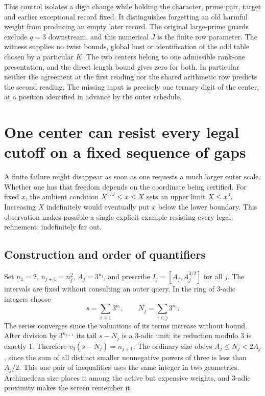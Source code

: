 \documentclass[12pt,letterpaper]{article}
\begin{document}
This control isolates a digit change while holding the character, prime pair, target and earlier exceptional record fixed. It distinguishes forgetting an old harmful weight from producing an empty later record. The original large-prime guards exclude \(q=3\) downstream, and this numerical \(J\) is the finite row parameter. The witness supplies no twist bounds, global host or identification of the odd table chosen by a particular \(K\). The two centers belong to one admissible rank-one presentation, and the direct length bound gives zero for both. In particular neither the agreement at the first reading nor the shared arithmetic row predicts the second reading. The missing input is precisely one ternary digit of the center, at a position identified in advance by the outer schedule.


\section{One center can resist every legal cutoff on a fixed sequence of gaps}
\label{sec:sparse}
A finite failure might disappear as soon as one requests a much larger outer scale. Whether one has that freedom depends on the coordinate being certified. For fixed \(x\), the ambient condition \(X^{1/J}\le x\le X\) sets an upper limit \(X\le x^J\). Increasing \(X\) indefinitely would eventually put \(x\) below the lower boundary. This observation makes possible a single explicit example resisting every legal refinement, indefinitely far out.

\subsection{Construction and order of quantifiers}
Set \(n_1=2\), \(n_{j+1}=n_j^2\), \(A_j=3^{n_j}\), and prescribe \(I_j=[A_j,A_j^{3/2}]\) for all \(j\). The intervals are fixed without consulting an outer query. In the ring of 3-adic integers choose
\[
      s=\sum_{i\ge1}3^{n_i},\qquad N_j=\sum_{i\le j}3^{n_i}.
\]
The series converges since the valuations of its terms increase without bound. After division by \(3^{n_{j+1}}\) its tail \(s-N_j\) is a 3-adic unit: its reduction modulo 3 is exactly 1. Therefore \(v_3(s-N_j)=n_{j+1}\). The ordinary size obeys \(A_j\le N_j<2A_j\), since the sum of all distinct smaller nonnegative powers of three is less than \(A_j/2\). This one pair of inequalities uses the same integer in two geometries. Archimedean size places it among the active but expensive weights, and 3-adic proximity makes the screen remember it.
\end{document}
